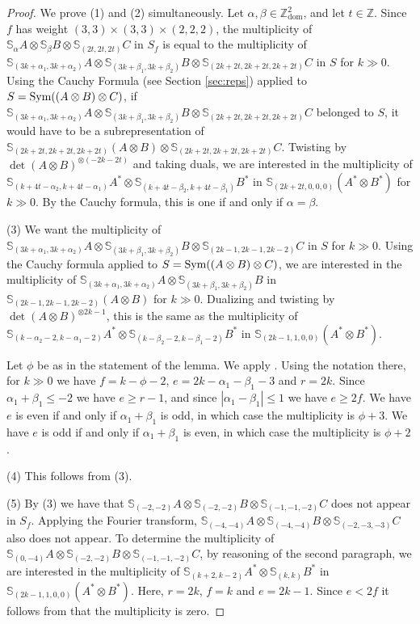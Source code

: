 \documentclass[11pt,reqno]{amsart}
\newcommand{\oo}{\otimes}
\newcommand{\bS}{\mathbb{S}}
\newcommand{\tn}{\textnormal}
\renewcommand{\det}{\operatorname{det}}
\newcommand{\dom}{\operatorname{dom}}
\numberwithin{equation}{section}
\begin{document}
\begin{proof} We prove (1) and (2) simultaneously.  Let $\alpha,\beta \in \mathbb{Z}^2_{\dom}$, and let $t\in \mathbb{Z}$. Since $f$ has weight $(3,3)\times (3,3)\times (2,2,2)$, the multiplicity of $\bS_{\alpha}A\oo \bS_{\beta}B\oo \bS_{(2t,2t,2t)}C$ in $S_f$ is equal to the multiplicity of $\bS_{(3k+\alpha_1,3k+\alpha_2)}A\oo \bS_{(3k+\beta_1,3k+\beta_2)}B\oo \bS_{(2k+2t,2k+2t,2k+2t)}C$ in $S$ for $k\gg 0$. Using the Cauchy Formula (see Section \ref{sec:reps}) applied to $S=\tn{Sym}((A\oo B)\oo C)$, if $\bS_{(3k+\alpha_1,3k+\alpha_2)}A\oo \bS_{(3k+\beta_1,3k+\beta_2)}B\oo \bS_{(2k+2t,2k+2t,2k+2t)}C$ belonged to $S$, it would have to be a subrepresentation of $\bS_{(2k+2t,2k+2t,2k+2t)}(A\oo B)\oo \bS_{(2k+2t,2k+2t,2k+2t)}C$. Twisting by $\det(A\oo B)^{\oo(-2k-2t)}$ and taking duals, we are interested in the multiplicity of $\bS_{(k+4t-\alpha_2,k+4t-\alpha_1)}A^{\ast}\oo \bS_{(k+4t-\beta_2,k+4t-\beta_1)}B^{\ast}$ in $\bS_{(2k+2t,0,0,0)}(A^{\ast}\oo B^{\ast})$ for $k\gg 0$. By the Cauchy formula, this is one if and only if $\alpha=\beta$.

(3) We want the multiplicity of $\bS_{(3k+\alpha_1,3k+\alpha_2)}A\oo \bS_{(3k+\beta_1,3k+\beta_2)}B\oo \bS_{(2k-1,2k-1,2k-2)}C$ in $S$ for $k\gg 0$. Using the Cauchy formula applied to $S=\tn{Sym}((A\oo B)\oo C)$, we are interested in the multiplicity of $\bS_{(3k+\alpha_1,3k+\alpha_2)}A\oo \bS_{(3k+\beta_1,3k+\beta_2)}B$ in $\bS_{(2k-1,2k-1,2k-2)}(A\oo B)$ for $k\gg 0$. Dualizing and twisting by $\det(A\oo B)^{\otimes 2k-1}$, this is the same as the multiplicity of $\bS_{(k-\alpha_2-2,k-\alpha_1-2)}A^{\ast}\oo \bS_{(k-\beta_2-2,k-\beta_1-2)}B^{\ast}$ in $\bS_{(2k-1,1,0,0)}(A^{\ast}\oo B^{\ast})$.

Let $\phi$ be as in the statement of the lemma. We apply \cite[Corollary 4.3b]{raicu2012secant}. Using the notation there, for $k\gg 0$ we have $f=k-\phi-2$, $e=2k-\alpha_1-\beta_1-3$ and $r=2k$. Since $\alpha_1+\beta_1\leq -2$ we have $e\geq r-1$, and since $|\alpha_1-\beta_1|\leq 1$ we have $e\geq 2f$. We have $e$ is even if and only if $\alpha_1+\beta_1$ is odd, in which case the multiplicity is $\phi+3$. We have $e$ is odd if and only if $\alpha_1+\beta_1$ is even, in which case the multiplicity is $\phi+2$.

(4) This follows from (3).

(5) By (3) we have that $\bS_{(-2,-2)}A\oo \bS_{(-2,-2)}B\oo \bS_{(-1,-1,-2)}C$ does not appear in $S_f$. Applying the Fourier transform, $\bS_{(-4,-4)}A\oo \bS_{(-4,-4)}B\oo \bS_{(-2,-3,-3)}C$ also does not appear. To determine the multiplicity of $\bS_{(0,-4)}A\oo \bS_{(-2,-2)}B\oo \bS_{(-1,-1,-2)}C$, by reasoning of the second paragraph, we are interested in the multiplicity of $\bS_{(k+2,k-2)}A^{\ast}\oo \bS_{(k,k)}B^{\ast}$ in $\bS_{(2k-1,1,0,0)}(A^{\ast}\oo B^{\ast})$. Here, $r=2k$, $f=k$ and $e=2k-1$. Since $e<2f$ it follows from \cite[Corollary 4.3b]{raicu2012secant} that the multiplicity is zero.
\end{proof}
\end{document}
